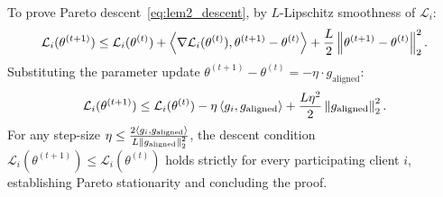 \begin{IEEEproof}
To prove Pareto descent~\eqref{eq:lem2_descent}, by $L$-Lipschitz smoothness of $\mathcal{L}_i$:
\begin{equation}
\mathcal{L}_i(\theta^{(t+1)}) \le \mathcal{L}_i(\theta^{(t)}) + \left\langle\nabla \mathcal{L}_i(\theta^{(t)}),\theta^{(t+1)} - \theta^{(t)}\right\rangle + \frac{L}{2} \left\lVert\theta^{(t+1)} - \theta^{(t)}\right\rVert_2^2.
\end{equation}
Substituting the parameter update $\theta^{(t+1)} - \theta^{(t)} = -\eta \cdot g_{\text{aligned}}$:
\begin{equation}
\mathcal{L}_i(\theta^{(t+1)}) \le \mathcal{L}_i(\theta^{(t)}) - \eta \left\langle g_i,g_{\text{aligned}}\right\rangle + \frac{L \eta^2}{2} \left\lVert g_{\text{aligned}}\right\rVert_2^2.
\end{equation}
For any step-size $\eta \le \frac{2 \left\langle g_i,g_{\text{aligned}}\right\rangle}{L \left\lVert g_{\text{aligned}}\right\rVert_2^2}$, the descent condition $\mathcal{L}_i(\theta^{(t+1)}) \le \mathcal{L}_i(\theta^{(t)})$ holds strictly for every participating client $i$, establishing Pareto stationarity and concluding the proof.
\end{IEEEproof}
